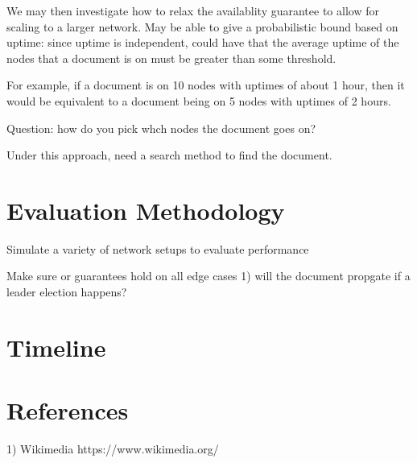 \documentclass{article}
\begin{document}
We may then investigate how to relax the availablity guarantee to allow for
scaling to a larger network. May be able to give a probabilistic bound based on uptime:
since uptime is independent, could have that the average uptime of the nodes that
a document is on must be greater than some threshold.

For example, if a document is on 10 nodes with uptimes of about 1 hour, then it
would be equivalent to a document being on 5 nodes with uptimes of 2 hours.

Question: how do you pick whch nodes the document goes on?

Under this approach, need a search method to find the document.


\section{Evaluation Methodology}
Simulate a variety of network setups to evaluate performance

Make sure or guarantees hold on all edge cases
1) will the document propgate if a leader election happens?

\section{Timeline}
\section{References}
1) Wikimedia https://www.wikimedia.org/
\end{document}
